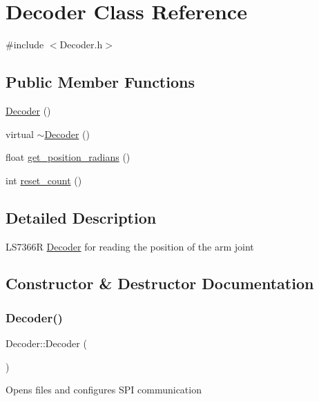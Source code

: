 \hypertarget{classDecoder}{}\section{Decoder Class Reference}
\label{classDecoder}


{\ttfamily \#include $<$Decoder.\+h$>$}

\subsection*{Public Member Functions}
\begin{DoxyCompactItemize}
\item 
\mbox{\hyperlink{classDecoder_a691a867940a1c494b77e458ae1325352}{Decoder}} ()
\item 
virtual \mbox{\hyperlink{classDecoder_a8b70f4475ae0852b138d63f6d8ddb298}{$\sim$\+Decoder}} ()
\item 
float \mbox{\hyperlink{classDecoder_a27b38533ded3df3b1d81011105d0ae73}{get\+\_\+position\+\_\+radians}} ()
\item 
int \mbox{\hyperlink{classDecoder_aaf6ef0ea1fb97ae3e2b2c764529134bc}{reset\+\_\+count}} ()
\end{DoxyCompactItemize}


\subsection{Detailed Description}
L\+S7366R \mbox{\hyperlink{classDecoder}{Decoder}} for reading the position of the arm joint 

\subsection{Constructor \& Destructor Documentation}
\mbox{\label{classDecoder_a691a867940a1c494b77e458ae1325352}} 
\subsubsection{\texorpdfstring{Decoder()}{Decoder()}}
{\footnotesize\ttfamily Decoder\+::\+Decoder (\begin{DoxyParamCaption}{ }\end{DoxyParamCaption})}

Opens files and configures S\+PI communication \mbox{\label{classDecoder_a8b70f4475ae0852b138d63f6d8ddb298}} 
